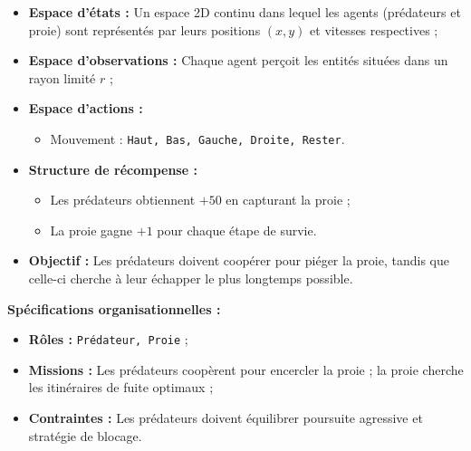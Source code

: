\documentclass[pdflatex,sn-mathphys-num]{sn-jnl}%
\theoremstyle{thmstyleone}%
\theoremstyle{thmstyletwo}%
\theoremstyle{thmstylethree}%
\begin{document}
\begin{itemize}
    \item \textbf{Espace d'états :} Un espace 2D continu dans lequel les agents (prédateurs et proie) sont représentés par leurs positions $(x, y)$ et vitesses respectives ;
    \item \textbf{Espace d'observations :} Chaque agent perçoit les entités situées dans un rayon limité $r$ ;
    \item \textbf{Espace d'actions :}
          \begin{itemize}
              \item Mouvement : \texttt{Haut, Bas, Gauche, Droite, Rester}.
          \end{itemize}
    \item \textbf{Structure de récompense :}
          \begin{itemize}
              \item Les prédateurs obtiennent $+50$ en capturant la proie ;
              \item La proie gagne $+1$ pour chaque étape de survie.
          \end{itemize}
    \item \textbf{Objectif :} Les prédateurs doivent coopérer pour piéger la proie, tandis que celle-ci cherche à leur échapper le plus longtemps possible.
\end{itemize}

\textbf{Spécifications organisationnelles :}
\begin{itemize}
    \item \textbf{Rôles :} \texttt{Prédateur, Proie} ;
    \item \textbf{Missions :} Les prédateurs coopèrent pour encercler la proie ; la proie cherche les itinéraires de fuite optimaux ;
    \item \textbf{Contraintes :} Les prédateurs doivent équilibrer poursuite agressive et stratégie de blocage.
\end{itemize}
\end{document}
